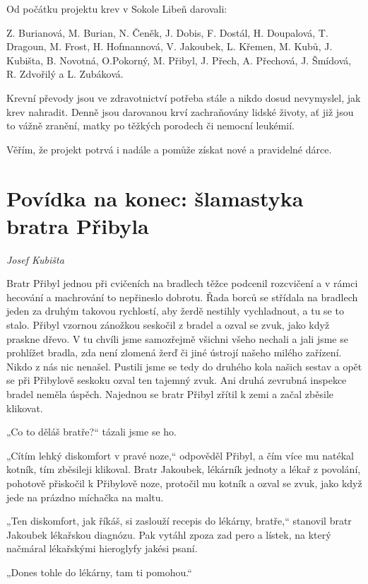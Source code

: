Od počátku projektu krev v Sokole Libeň darovali:

Z. Burianová, M. Burian, N. Čeněk, J. Dobis, F. Dostál, H. Doupalová, T.
Dragoun, M. Frost, H. Hofmannová, V. Jakoubek, L. Křemen, M. Kubů, J.
Kubišta, B. Novotná, O.Pokorný, M. Přibyl, J. Přech, A. Přechová, J.
Šmídová, R. Zdvořilý a L. Zubáková.

Krevní převody jsou ve zdravotnictví potřeba stále a nikdo dosud
nevymyslel, jak krev nahradit. Denně jsou darovanou krví zachraňovány
lidské životy, ať již jsou to vážně zranění, matky po těžkých porodech
či nemocní leukémií.

Věřím, že projekt potrvá i nadále a pomůže získat nové a pravidelné
dárce.

\section{Povídka na konec: šlamastyka bratra
Přibyla}\label{povuxeddka-na-konec-ux161lamastyka-bratra-pux159ibyla}

\emph{Josef Kubišta}

Bratr Přibyl jednou při cvičeních na bradlech těžce podcenil rozcvičení
a v rámci hecování a machrování to nepřineslo dobrotu. Řada borců se
střídala na bradlech jeden za druhým takovou rychlostí, aby žerdě
nestihly vychladnout, a tu se to stalo. Přibyl vzornou zánožkou seskočil
z bradel a ozval se zvuk, jako když praskne dřevo. V tu chvíli jsme
samozřejmě všichni všeho nechali a jali jsme se prohlížet bradla, zda
není zlomená žerď či jiné ústrojí našeho milého zařízení. Nikdo z nás
nic nenašel. Pustili jsme se tedy do druhého kola našich sestav a opět
se při Přibylově seskoku ozval ten tajemný zvuk. Ani druhá zevrubná
inspekce bradel neměla úspěch. Najednou se bratr Přibyl zřítil k zemi a
začal zběsile klikovat.

„Co to děláš bratře?{}`` tázali jsme se ho.

„Cítím lehký diskomfort v pravé noze,`` odpověděl Přibyl, a čím více mu
natékal kotník, tím zběsileji klikoval. Bratr Jakoubek, lékárník jednoty
a lékař z povolání, pohotově přiskočil k Přibylově noze, protočil mu
kotník a ozval se zvuk, jako když jede na prázdno míchačka na maltu.

„Ten diskomfort, jak říkáš, si zaslouží recepis do lékárny, bratře,``
stanovil bratr Jakoubek lékařskou diagnózu. Pak vytáhl zpoza zad pero a
lístek, na který načmáral lékařskými hieroglyfy jakési psaní.

„Dones tohle do lékárny, tam ti pomohou.``

